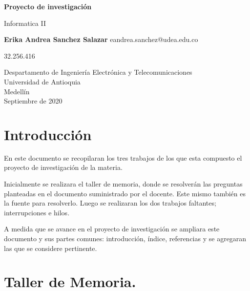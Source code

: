 \documentclass{article}
\begin{document}
\begin{titlepage}
    \begin{center}
        \vspace*{1cm}
            
        \Huge
        \textbf{Proyecto de investigación}
            
        \vspace{0.5cm}
        \LARGE
        Informatica II
            
        \vspace{1.5cm}
            
        \textbf{Erika Andrea Sanchez Salazar}
        \LARGE
         eandrea.sanchez@udea.edu.co
         
        32.256.416
        
       
            
        \vfill
            
        \vspace{0.8cm}
            
        \Large
        Despartamento de Ingeniería Electrónica y Telecomunicaciones\\
        Universidad de Antioquia\\
        Medellín\\
        Septiembre de 2020
            
    \end{center}
\end{titlepage}

\tableofcontents
\newpage
\section{Introducción}\label{intro}
En este documento se recopilaran los tres trabajos de los que esta compuesto el proyecto de investigación de la materia. 

Inicialmente se realizara el taller de memoria, donde se resolverán las preguntas planteadas en el documento suministrado por el docente. Este mismo también es la fuente para resolverlo. Luego se realizaran los dos trabajos faltantes; interrupciones e hilos.

A medida que se avance en el proyecto de investigación se ampliara este documento y sus partes comunes: introducción, índice, referencias y se agregaran las que se considere pertinente.

\newpage
\section{Taller de Memoria.} \label{contenido}
\end{document}
